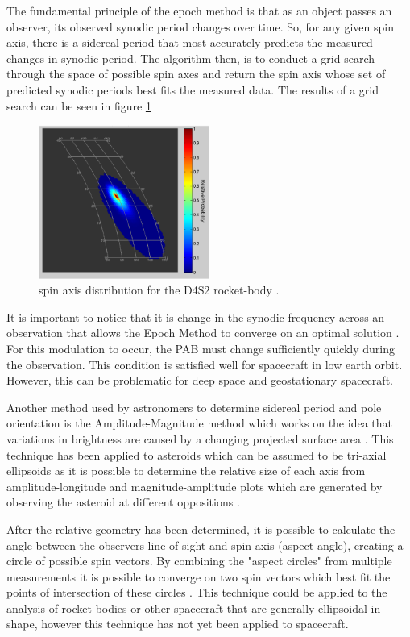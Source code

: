 \documentclass{article}
\begin{document}
The fundamental principle of the epoch method is that as an object passes an observer, its observed synodic period changes over time. So, for any given spin axis, there is a sidereal period that most accurately predicts the measured changes in synodic period. The algorithm then, is to conduct a grid search through the space of possible spin axes and return the spin axis whose set of predicted synodic periods best fits the measured data. The results of a grid search can be seen in figure \ref{epoch_grid_search_im}

\begin{figure}[h]
	\centering
	\includegraphics[width=0.5\textwidth]{spin_axis_OPTICAL_CHARACTERIZATION}
	\caption{spin axis distribution for the D4S2 rocket-body \cite{Hall2014OpticalCO}.}
	\label{epoch_grid_search_im}
\end{figure}

It is important to notice that it is change in the synodic frequency across an observation that allows the Epoch Method to converge on an optimal solution \cite{Wallace}. For this modulation to occur, the PAB must change sufficiently quickly during the observation. This condition is satisfied well for spacecraft in low earth orbit. However, this can be problematic for deep space and geostationary spacecraft.

Another method used by astronomers to determine sidereal period and pole orientation is the Amplitude-Magnitude method which works on the idea that variations in brightness are caused by a changing projected surface area \cite{Magnusson1989DeterminationOP}. This technique has been applied to asteroids which can be assumed to be tri-axial ellipsoids as it is possible to determine the relative size of each axis from amplitude-longitude and magnitude-amplitude plots which are generated by observing the asteroid at different oppositions \cite{Magnusson1989DeterminationOP}. 

After the relative geometry has been determined, it is possible to calculate the angle between the observers line of sight and spin axis (aspect angle), creating a circle of possible spin vectors. By combining the "aspect circles" from multiple measurements it is possible to converge on two spin vectors which best fit the points of intersection of these circles \cite{Magnusson1989DeterminationOP}. This technique could be applied to the analysis of rocket bodies or other spacecraft that are generally ellipsoidal in shape, however this technique has not yet been applied to spacecraft.
\end{document}
